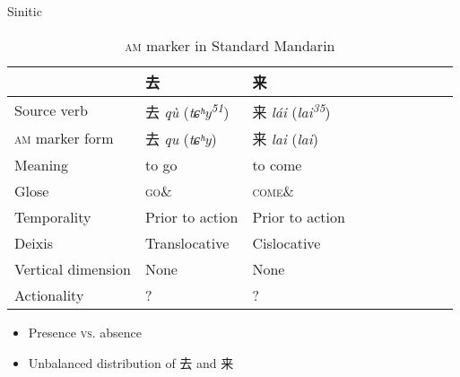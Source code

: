 \documentclass[xcolor=table]{beamer}
\newcommand{\ipa}[1]{{\phon\textit{#1}}}
\newcommand{\zh}[1]{{\cn #1}}
\begin{document}
\begin{frame}{Sinitic}
\begin{table} [H]
\caption{\textsc{am} marker in Standard Mandarin} \centering
\begin{tabular}{llllllllll}
\hline
& \zh{去} & \zh{来}  \\
\hline
Source verb & \zh{去} \ipa{qù} (\ipa{tɕʰy\textsuperscript{51}}) &  \zh{来} \ipa{lái} (\ipa{lai\textsuperscript{35}}) \\
\textsc{am} marker form & \zh{去} \ipa{qu} (\ipa{tɕʰy}) &  \zh{来} \ipa{lai} (\ipa{lai}) \\
Meaning & to go  & to come  \\
Glose & \textsc{go}$\&$ & \textsc{come}$\&$ \\
Temporality  &  Prior to action & Prior to action \\
Deixis & Translocative & Cislocative  \\
Vertical dimension & None & None \\
Actionality & ? & ?  \\
\hline
\end{tabular}
\end{table}

\begin{itemize}
\item Presence \textsc{vs.} absence
\item Unbalanced distribution of \zh{去} and \zh{来}
\end{itemize}

\end{frame}
\end{document}
